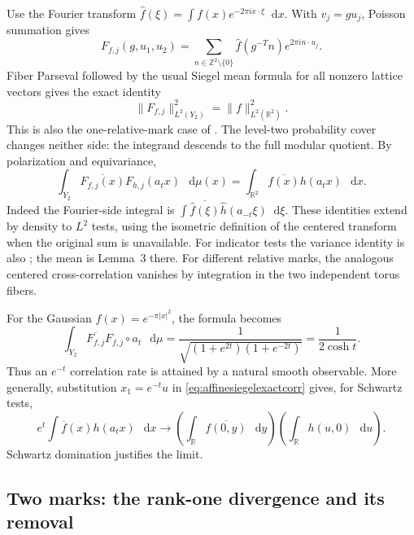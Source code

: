 \documentclass[11pt,a4paper]{article}
\numberwithin{equation}{section}
\theoremstyle{definition}
\theoremstyle{remark}
\newcommand{\dd}{\mathop{}\!\mathrm d}
\newcommand{\RR}{\mathbb R}
\newcommand{\ZZ}{\mathbb Z}
\begin{document}
Use the Fourier transform
$\widehat f(\xi)=\int f(x)e^{-2\pi i x\cdot\xi}\dd x$.
With $v_j=gu_j$, Poisson summation gives
\[
 F_{f,j}(g,u_1,u_2)=
 \sum_{n\in\ZZ^2\setminus\{0\}}
       \widehat f(g^{-T}n)e^{2\pi i n\cdot u_j}.
\]
Fiber Parseval followed by the usual Siegel mean formula for all
nonzero lattice vectors gives the exact identity
\begin{equation}
 \|F_{f,j}\|_{L^2(Y_2)}^2=\|f\|_{L^2(\RR^2)}^2.
 \label{eq:affinesiegelisometry}
\end{equation}
This is also the one-relative-mark case of
\cite[Proposition~6.11]{AthreyaLagaceMollerRaum}.
The level-two probability cover changes neither side: the integrand
descends to the full modular quotient. By polarization and equivariance,
\begin{equation}
 \boxed{
 \int_{Y_2}\overline{F_{f,j}(x)}F_{h,j}(a_tx)\,\dd\mu(x)
 =\int_{\RR^2}\overline{f(x)}h(a_tx)\,\dd x.
 }
 \label{eq:affinesiegelexactcorr}
\end{equation}
Indeed the Fourier-side integral is
$\int\overline{\widehat f(\xi)}\widehat h(a_{-t}\xi)\dd\xi$.
These identities extend by density to $L^2$ tests, using the isometric
definition of the centered transform when the original sum is unavailable.
For indicator tests the variance identity is also
\cite[Lemma~4]{AthreyaAffineLattices}; the mean is Lemma~3 there.
For different relative marks, the analogous centered cross-correlation
vanishes by integration in the two independent torus fibers.

For the Gaussian $f(x)=e^{-\pi|x|^2}$, the formula becomes
\begin{equation}
 \int_{Y_2}\overline{F_{f,j}}F_{f,j}\circ a_t\,\dd\mu
 =\frac1{\sqrt{(1+e^{2t})(1+e^{-2t})}}
 =\frac1{2\cosh t}.
 \label{eq:affinegaussiancorr}
\end{equation}
Thus an $e^{-t}$ correlation rate is attained by a natural smooth
observable. More generally, substitution $x_1=e^{-t}u$ in
\eqref{eq:affinesiegelexactcorr} gives, for Schwartz tests,
\[
 e^t\int\overline f(x)h(a_tx)\,\dd x
 \longrightarrow
 \left(\int_\RR\overline{f(0,y)}\,\dd y\right)
 \left(\int_\RR h(u,0)\,\dd u\right).
\]
Schwartz domination justifies the limit.

\subsection{Two marks: the rank-one divergence and its removal}
\label{subsec:affineranktwo}
\end{document}
